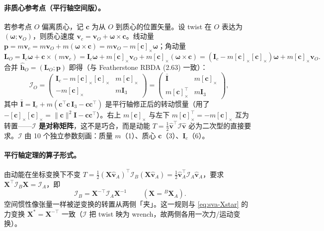 \paragraph{非质心参考点（平行轴空间版）。}
若参考点 $O$ 偏离质心，记 $\mathbf c$ 为从 $O$ 到质心的位置矢量。设 twist 在 $O$ 表达为 $(\boldsymbol\omega;\mathbf v_O)$，则质心速度 $\mathbf v_c=\mathbf v_O+\boldsymbol\omega\times\mathbf c$。线动量
$\mathbf p=m\mathbf v_c=m\mathbf v_O+m(\boldsymbol\omega\times\mathbf c)=m\mathbf v_O-m[\mathbf c]_\times\boldsymbol\omega$；角动量
\[
  \mathbf L_O=\mathbf I_c\boldsymbol\omega+\mathbf c\times(m\mathbf v_c)
  =\mathbf I_c\boldsymbol\omega+m[\mathbf c]_\times\mathbf v_O+m[\mathbf c]_\times(\boldsymbol\omega\times\mathbf c)
  =(\mathbf I_c-m[\mathbf c]_\times[\mathbf c]_\times)\boldsymbol\omega+m[\mathbf c]_\times\mathbf v_O.
\]
合并 $\hat{\mathbf h}_O=(\mathbf L_O;\mathbf p)$ 即得（与 Featherstone RBDA (2.63) 一致\cite{featherstone2008rigid}）：
\begin{equation}
  \mathcal I_O=\begin{pmatrix}\mathbf I_c-m[\mathbf c]_\times[\mathbf c]_\times & m[\mathbf c]_\times\\ -m[\mathbf c]_\times & m\mathbf I_3\end{pmatrix}
  =\begin{pmatrix}\bar{\mathbf I} & m[\mathbf c]_\times\\ m[\mathbf c]_\times^\top & m\mathbf I_3\end{pmatrix},
  \label{eq:sva-IO}
\end{equation}
其中 $\bar{\mathbf I}=\mathbf I_c+m(\mathbf c^\top\mathbf c\,\mathbf I_3-\mathbf c\mathbf c^\top)$ 是平行轴修正后的转动惯量（用了 $-[\mathbf c]_\times[\mathbf c]_\times=\|\mathbf c\|^2\mathbf I-\mathbf c\mathbf c^\top$）。右上 $m[\mathbf c]_\times$ 与左下 $m[\mathbf c]_\times^\top=-m[\mathbf c]_\times$ 互为转置——\textbf{$\mathcal I$ 是对称矩阵}，这不是巧合，而是动能 $T=\tfrac12\hat{\mathbf v}^\top\mathcal I\hat{\mathbf v}$ 必为二次型的直接要求。$\mathcal I$ 由 10 个独立参数刻画：质量 $m$（1）、质心 $\mathbf c$（3）、$\mathbf I_c$（6）。

\paragraph{平行轴定理的算子形式。}
由动能在坐标变换下不变 $T=\tfrac12(\mathbf X\hat{\mathbf v}_A)^\top\mathcal I_B(\mathbf X\hat{\mathbf v}_A)=\tfrac12\hat{\mathbf v}_A^\top\mathcal I_A\hat{\mathbf v}_A$，要求 $\mathbf X^\top\mathcal I_B\mathbf X=\mathcal I_A$，即
\begin{equation}
  \boxed{\;\mathcal I_B=\mathbf X^{-\top}\mathcal I_A\mathbf X^{-1}\;}
  \qquad(\mathbf X={}^B\mathbf X_A).
  \label{eq:sva-Iparallel}
\end{equation}
空间惯性像张量一样被逆变换的转置从两侧「夹」。这一规则与 \cref{eq:sva-Xstar} 的力变换 $\mathbf X^*=\mathbf X^{-\top}$ 一致（$\mathcal I$ 把 twist 映为 wrench，故两侧各用一次力/运动变换）。

